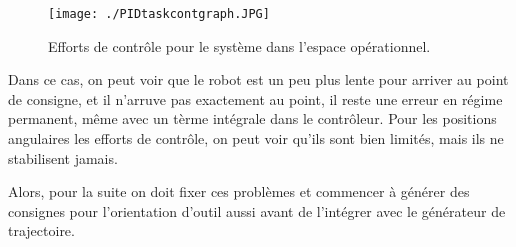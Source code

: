 \begin{figure}[H]
	\begin{center}	
		\texttt{[image: ./PIDtaskcontgraph.JPG]}
		\caption{Efforts de contrôle pour le système dans l'espace opérationnel.}
		\label{fig:PIDtaskcontgraph}
	\end{center}
\end{figure}

Dans ce cas, on peut voir que le robot est un peu plus lente pour arriver au point de consigne, et il n'arruve pas exactement au point, il reste une erreur en régime permanent, même avec un tèrme intégrale dans le contrôleur. Pour les positions angulaires les efforts de contrôle, on peut voir qu'ils sont bien limités, mais ils ne stabilisent jamais.

Alors, pour la suite on doit fixer ces problèmes et commencer à générer des consignes pour l'orientation d'outil aussi avant de l'intégrer avec le générateur de trajectoire.